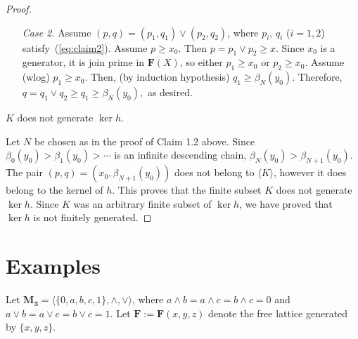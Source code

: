 \begin{proof}
\begin{itemize}
\item[{\it Case 2.}] Assume $(p, q) = (p_1, q_1) \vee (p_2, q_2)$, where $p_i$, $q_i$ ($i = 1, 2$) satisfy~(\ref{eq:claim2}). Assume $p\geqslant x_0$. Then $p = p_1 \vee p_2 \geqslant x$.  Since $x_0$ is a generator, it is join prime in $\mathbf{F}(X)$, so either $p_1 \geqslant x_0$ or $p_2 \geqslant x_0$.  Assume (wlog) $p_1 \geqslant x_0$. Then, (by induction hypothesis) $q_1\geqslant \beta_N(y_0).$
Therefore, $q = q_1 \vee q_2 \geqslant q_1 \geqslant \beta_N(y_0),$ as desired.
\end{itemize}

\medskip

  $K$ does not generate $\ker h$.

 Let $N$ be chosen as in the proof of Claim 1.2 above.  Since $\beta_0(y_0) > \beta_1(y_0) > \cdots$ is an infinite descending chain, $\beta_{N}(y_0) > \beta_{N+1}(y_0)$. The pair $(p, q) = (x_0, \beta_{N+1}(y_0))$ does not belong to $\langle K\rangle$, however it does belong to the kernel of $h$.  This proves that the finite subset $K$ does not generate $\ker h$.  Since $K$ was an arbitrary finite subset of $\ker h$, we have proved that $\ker h$ is not finitely generated.

\end{proof}

\section{Examples}

Let $\mathbf{M_3} = \langle \{0, a, b, c, 1\}, \wedge, \vee\rangle$, where $a \wedge b = a \wedge c = b \wedge c = 0$ and $a \vee b = a \vee c = b \vee c = 1.$ Let $\mathbf F := \mathbf F(x, y, z)$ denote the free lattice generated by $\{x, y, z\}$.

